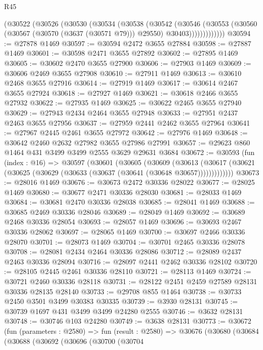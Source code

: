 \begin{lexlean}{R45}
\begin{coremodule}
            (@30522
              (@30526
                (@30530
                  (@30534
                    (@30538
                      (@30542
                        (@30546
                          (@30553
                            (@30560
                              (@30567 (@30570 (@3637 (@30571 @79))) @29550)
                              @30403)))))))))))))
@30594 := @27878 @1469
@30597 := @30594 @2472 @3655 @27884
@30598 := @27887 @1469
@30601 := @30598 @2471 @3655 @27892
@30602 := @27895 @1469
@30605 := @30602 @2470 @3655 @27900
@30606 := @27903 @1469
@30609 := @30606 @2469 @3655 @27908
@30610 := @27911 @1469
@30613 := @30610 @2468 @3655 @27916
@30614 := @27919 @1469
@30617 := @30614 @2467 @3655 @27924
@30618 := @27927 @1469
@30621 := @30618 @2466 @3655 @27932
@30622 := @27935 @1469
@30625 := @30622 @2465 @3655 @27940
@30629 := @27943 @2434 @2464 @3655 @27948
@30633 := @27951 @2437 @2463 @3655 @27956
@30637 := @27959 @2441 @2462 @3655 @27964
@30641 := @27967 @2445 @2461 @3655 @27972
@30642 := @27976 @1469
@30648 := @30642 @2460 @2632 @27982 @3655 @27986 @27991
@30657 := @29623 @860 @1464 @431 @3499 @3499 @2555 @3629 @29631 @3684
@30672 := @30593
    (fun (index : @16) =>
    @30597
      (@30601
        (@30605
          (@30609
            (@30613
              (@30617 (@30621 (@30625 (@30629 (@30633 (@30637 (@30641 (@30648 @30657)))))))))))))
@30673 := @28016 @1469
@30676 := @30673 @2472 @30336 @28022
@30677 := @28025 @1469
@30680 := @30677 @2471 @30336 @28030
@30681 := @28033 @1469
@30684 := @30681 @2470 @30336 @28038
@30685 := @28041 @1469
@30688 := @30685 @2469 @30336 @28046
@30689 := @28049 @1469
@30692 := @30689 @2468 @30336 @28054
@30693 := @28057 @1469
@30696 := @30693 @2467 @30336 @28062
@30697 := @28065 @1469
@30700 := @30697 @2466 @30336 @28070
@30701 := @28073 @1469
@30704 := @30701 @2465 @30336 @28078
@30708 := @28081 @2434 @2464 @30336 @28086
@30712 := @28089 @2437 @2463 @30336 @28094
@30716 := @28097 @2441 @2462 @30336 @28102
@30720 := @28105 @2445 @2461 @30336 @28110
@30721 := @28113 @1469
@30724 := @30721 @2460 @30336 @28118
@30731 := @28122 @2451 @2459 @27589 @28131 @30336 @28135 @28140
@30733 := @29708 @855 @1464
@30738 := @30733 @2450 @3501 @3499 @30383 @30335
@30739 := @3930 @28131
@30745 := @30739 @1697 @431 @3499 @3499 @24280 @2555
@30746 := @3632 @28131
@30748 := @30746 @103 @24280
@30749 := @3638 @28131
@30773 := @30672
    (fun (parameters : @2580) =>
    fun (result : @2580) =>
    @30676
      (@30680
        (@30684
          (@30688
            (@30692
              (@30696
                (@30700
                  (@30704

\end{coremodule}
\end{lexlean}
